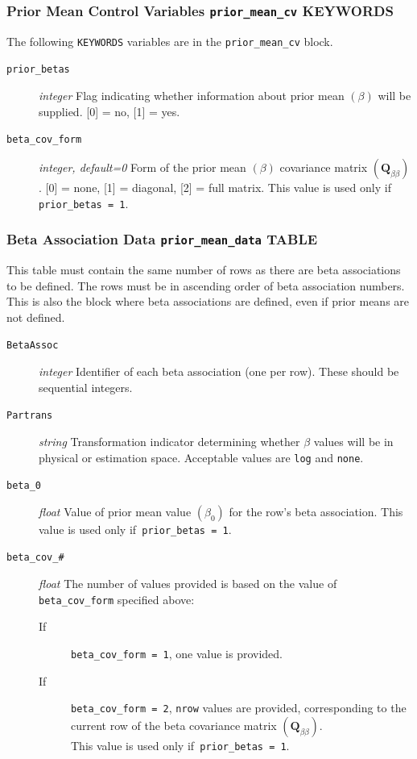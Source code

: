 \documentclass[11pt,oneside,onecolumn]{usgsreport}
\begin{document}
\begin{appendix}
\begin{bibunit}
\subsubsection{Prior Mean Control Variables \texttt{prior\_mean\_cv} KEYWORDS}

The following \texttt{KEYWORDS} variables are in the \texttt{prior\_mean\_cv}
block.
\begin{description}
\item [{\texttt{prior\_betas}}] \emph{integer} Flag indicating whether
information about prior mean $\left(\beta\right)$ will be supplied.
{[}0{]} = no, {[}1{]} = yes.
\item [{\texttt{beta\_cov\_form}}] \emph{integer, default=0 }Form of the
prior mean $\left(\beta\right)$ covariance matrix $\left(\mathbf{Q}_{\beta\beta}\right)$.
{[}0{]} = none, {[}1{]} = diagonal, {[}2{]} = full matrix. This value
is used only if\texttt{ prior\_betas = 1}.\emph{ }
\end{description}

\subsubsection{Beta Association Data \texttt{prior\_mean\_data} TABLE}

This table must contain the same number of rows as there are beta
associations to be defined. The rows must be in ascending order of
beta association numbers. This is also the block where beta associations
are defined, even if prior means are not defined.
\begin{description}
\item [{\texttt{BetaAssoc}}] \emph{integer }Identifier of each beta association
(one per row). These should be sequential integers.
\item [{\texttt{Partrans}}] \emph{string }Transformation indicator determining
whether $\beta$ values will be in physical or estimation space. Acceptable
values are \texttt{log} and \texttt{none}. 
\item [{\texttt{beta\_0}}] \emph{float} Value of prior mean value $\left(\beta_{0}\right)$
for the row's beta association. This value is used only if\texttt{
prior\_betas = 1}.
\item [{\texttt{beta\_cov\_\#}}] \emph{float }The number of values provided
is based on the value of \texttt{beta\_cov\_form} specified above:

\begin{description}
\item [{\textmd{If}}] \texttt{beta\_cov\_form = 1}, one value is provided. 
\item [{\textmd{If}}] \texttt{beta\_cov\_form = 2}, \texttt{nrow} values
are provided, corresponding to the current row of the beta covariance
matrix $\left(\mathbf{Q}_{\beta\beta}\right)$.\\
This value is used only if\texttt{ prior\_betas = 1}.
\end{description}
\end{description}


\end{bibunit}
\end{appendix}
\end{document}
